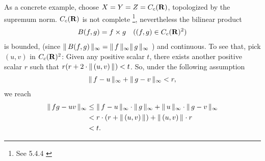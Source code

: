 \noindent
%
As a concrete example, choose %
%
  $X = Y = Z = C_c({\mathbf R})$, %
%
topologized by the supremum norm. %
%
$C_c({\mathbf R})$ is not complete%
%
  \footnote{
    See 5.4.4 \cite{AnalyseIII} 
  }, %
nevertheless the bilinear product %
%
  \begin{align}
    B(f, g) = f\times g \quad ((f, g)\in C_c(\R)^2) %
  \end{align}
%
is bounded, (since %
    $\| \,B(f,g)  \, \|_{\infty} =\| \,f \, \|_{\infty}\| \,g \, \|_{\infty}$%
) %
and continuous. To see that, pick $(u, v)$ in $C_c({\mathbf R})^2$: %
Given any positive scalar $t$, %
there exists another positive scalar $r$ such that %
%
  $r(r + 2\cdot\| \,(u,v) \, \|_{}) < t$. %
%
So, under the following assumption %
%
\begin{align}
  \norm{\infty}{f-u} + \norm{\infty}{g-v} < r, %
\end{align}
we reach %
%
  \begin{align}
    \norm{\infty}{fg - uv} %
      & \leq 
    \norm{\infty}{f-u} \cdot \norm{\infty}{g} + 
    \norm{\infty}{u}   \cdot \norm{\infty}{g-v} \\
      & < r\cdot (r+\norm{}{(u, v)}) + \norm{}{(u, v)} \cdot r \\
      & < t.
  \end{align}
